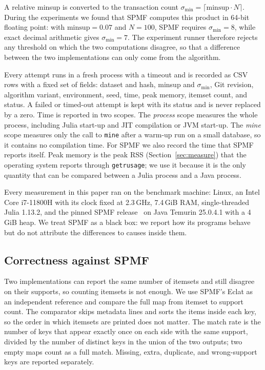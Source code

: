 A relative minsup is converted to the transaction count
$\sigma_{\min} = \lceil \mathrm{minsup} \cdot N \rceil$. During the experiments we found
that SPMF computes this product in 64-bit floating point: with $\mathrm{minsup} = 0.07$
and $N = 100$, SPMF requires $\sigma_{\min} = 8$, while exact decimal arithmetic gives
$\sigma_{\min} = 7$. The experiment runner therefore rejects any threshold on which the two
computations disagree, so that a difference between the two implementations can only come
from the algorithm.

Every attempt runs in a fresh process with a timeout and is recorded as CSV rows with a
fixed set of fields: dataset and hash, minsup and $\sigma_{\min}$, Git revision, algorithm
variant, environment, seed, time, peak memory, itemset count, and status. A failed or
timed-out attempt is kept with its status and is never replaced by a zero. Time is
reported in two scopes. The \emph{process} scope measures the whole process, including
Julia start-up and JIT compilation or JVM start-up. The \emph{mine} scope measures only the
call to \texttt{mine} after a warm-up run on a small database, so it contains no
compilation time. For SPMF we also record the time that SPMF reports itself. Peak memory
is the peak RSS (Section~\ref{sec:measure}) that the operating system reports through
\texttt{getrusage}; we use it because it is the only quantity that can be compared between
a Julia process and a Java process.

Every measurement in this paper ran on the benchmark machine: Linux, an Intel Core
i7-11800H with its clock fixed at 2.3\,GHz, 7.4\,GiB RAM, single-threaded Julia 1.13.2,
and the pinned SPMF release~\cite{spmf2016} on Java Temurin 25.0.4.1 with a 4\,GiB heap.
We treat SPMF as a black box: we report how its programs behave but do not attribute the
differences to causes inside them.

\subsection{Correctness against SPMF}
\label{sec:exact}
Two implementations can report the same number of itemsets and still disagree on their
supports, so counting itemsets is not enough. We use SPMF's Eclat as an independent
reference and compare the full map from itemset to support count. The comparator skips
metadata lines and sorts the items inside each key, so the order in which itemsets are
printed does not matter. The match rate is the number of keys that appear exactly once on
each side with the same support, divided by the number of distinct keys in the union of
the two outputs; two empty maps count as a full match. Missing, extra, duplicate, and
wrong-support keys are reported separately.

